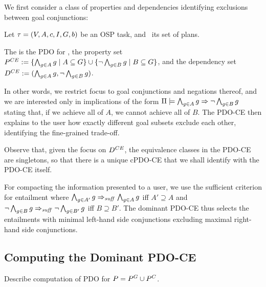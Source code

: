 We first consider a class of properties and dependencies identifying
exclusions between goal conjunctions:

\begin{definition}
Let $\tau =
(V,\allowbreak A,\allowbreak{\ensuremath{c}},\allowbreak I,\allowbreak G,\allowbreak{\ensuremath{b}})$
be an OSP task, and \plans\ its set of plans.  

The  is the PDO for
\plans, the property set $P^{CE} := \{\bigwedge_{g \in A}
g\allowbreak\mid\allowbreak A \subseteq G\} \cup \{\neg \bigwedge_{g
  \in B} g \allowbreak\mid\allowbreak B \subseteq G\}$, and the
dependency set $D^{CE} := (\bigwedge_{g \in A} g,\allowbreak\neg
\bigwedge_{g \in B} g)$.
\end{definition}

In other words, we restrict focus to goal conjunctions and negations
thereof, and we are interested only in implications of the form
$\Pi \models \bigwedge_{g \in A} g \Rightarrow \neg \bigwedge_{g \in B} g$
stating that, if we achieve all of $A$, we cannot achieve all of
$B$. The PDO-CE then explains to the user how exactly different goal
subsets exclude each other, identifying the fine-grained trade-off.

Observe that, given the focus on $D^{CE}$, the equivalence classes
in the PDO-CE are singletons, so that there is a unique cPDO-CE that
we shall identify with the PDO-CE itself.

For compacting the information presented to a user, we use the
sufficient criterion for entailment where $\bigwedge_{g \in A'} g
\Rightarrow_{\mathit{suff}} \bigwedge_{g \in A} g$ iff $A' \supseteq A$ and $\neg
\bigwedge_{g \in B} g \Rightarrow_{\mathit{suff}} \neg \bigwedge_{g \in B'} g$ iff $B
\supseteq B'$. The dominant PDO-CE thus selects the entailments with
minimal left-hand side conjunctions excluding maximal right-hand side
conjunctions.
%





\subsection{Computing the Dominant PDO-CE}
\label{goaldep:computing}

Describe computation of PDO for $P = P^{G} \cup P^{C}$.


